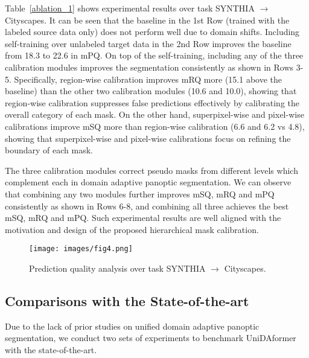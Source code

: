 \documentclass[10pt,twocolumn,letterpaper]{article}
\begin{document}
Table~\ref{ablation_1} shows experimental results over task SYNTHIA $\rightarrow$ Cityscapes. It can be seen that the baseline in the 1st Row (trained with the labeled source data only) does not perform well due to domain shifts. Including self-training over unlabeled target data in the 2nd Row improves the baseline from 18.3 to 22.6 in mPQ. On top of the self-training, including any of the three calibration modules improves the segmentation consistently as shown in Rows 3-5. Specifically, region-wise calibration improves mRQ more (15.1 above the baseline) than the other two calibration modules (10.6 and 10.0), showing that region-wise calibration suppresses false predictions effectively by calibrating the overall category of each mask. On the other hand, superpixel-wise and pixel-wise calibrations improve mSQ more than region-wise calibration (6.6 and 6.2 vs 4.8), showing that superpixel-wise and pixel-wise calibrations focus on refining the boundary of each mask.

The three calibration modules correct pseudo masks from different levels which complement each in domain adaptive panoptic segmentation. We can observe that combining any two modules further improves mSQ, mRQ and mPQ consistently as shown in Rows 6-8, and combining all three achieves the best mSQ, mRQ and mPQ. Such experimental results are well aligned with the motivation and design of the proposed hierarchical mask calibration.

\begin{figure*}[t]
\centering
\texttt{[image: images/fig4.png]}
\caption{Prediction quality analysis over task SYNTHIA $\rightarrow$ Cityscapes.
}
\label{fig:tp}
\end{figure*}










\subsection{Comparisons with the State-of-the-art}

Due to the lack of prior studies on unified domain adaptive panoptic segmentation, we conduct two sets of experiments to benchmark UniDAformer with the state-of-the-art.
\end{document}
